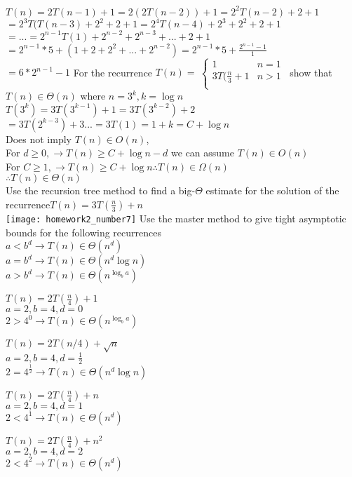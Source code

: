 \documentclass[12pt,largemargins]{homework}
\begin{document}
$T(n) = 2T(n-1)+1 =  2(2T(n-2))+1 = 2^2T(n-2)+2+1$\\
$=2^3T(T(n-3)+2^2+2+1 = 2^4T(n-4)+2^3+2^2+2+1$\\
$=...=2^{n-1}T(1)+2^{n-2}+2^{n-3}+...+2+1$\\
$=2^{n-1}*5+(1+2+2^2+...+2^{n-2})=2^{n-1}*5+\frac{2^{n-1}-1}{1}$\\
$=6*2^{n-1}-1$
\question
For the recurrence $T(n)=
\ \begin{cases} 
      1 & n =1\\
      3T(\frac{n}{3} +1 & n >1\\
   \end{cases}
\,$ show that $T(n) \in \Theta(n)$
where $n=3^k, k = \log n$\\
$ T(3^k) = 3T(3^{k-1}) +1 = 3T(3^{k-2}) + 2$\\
$ =3T(2^{k-3}) + 3 ... = 3T(1) = 1 + k = C + \log n $\\
Does not imply $ T(n) \in O(n) $, \\
For $ d \geq 0, \rightarrow T(n) \geq C+\log n -d$ we can assume $T(n) \in O(n) $\\
For $ C \geq 1, \rightarrow T(n) \geq C+\log n \therefore T(n) \in \Omega(n) $\\
$ \therefore T(n) \in \Theta(n) $\\
\newpage
\question
Use the recursion tree method to find a big-$ \Theta $ estimate for the solution of the recurrence$ T(n)=3T(\frac{n}{3})+n $\\
\texttt{[image: homework2\_number7]}
\question
Use the master method to give tight asymptotic bounds for the following recurrences\\
$ a < b^d \rightarrow T(n) \in  \Theta(n^d)$\\
$ a=b^d  \rightarrow T(n) \in \Theta (n^d\log n)$\\
$ a>b^d \rightarrow T(n) \in \Theta(n^{\log_b a}) $\\
\begin{alphaparts}
	\item 
	$ T(n) = 2T(\frac{n}{4})+1 $\\
	$ a = 2, b = 4, d=0 $\\
	$ 2 > 4^0 \rightarrow T(n) \in \Theta(n^{\log_b a})$\\
	\item 
	$ T(n)=2T(n/4) + \sqrt{n} $\\
	$ a=2,b=4,d=\frac{1}{2} $\\
	$ 2=4^{\frac{1}{2}} \rightarrow T(n) \in \Theta(n^d\log n) $\\
	\item 
	$ T(n) = 2T(\frac{n}{4})+n $\\
	$ a = 2, b = 4, d=1 $\\
	$ 2 < 4^1 \rightarrow T(n) \in \Theta(n^d)$\\
	\item 
	$ T(n) = 2T(\frac{n}{4})+n^2 $\\
	$ a = 2, b = 4, d=2 $\\
	$ 2 < 4^2 \rightarrow T(n) \in \Theta(n^d)$\\
\end{alphaparts}
\end{document}
